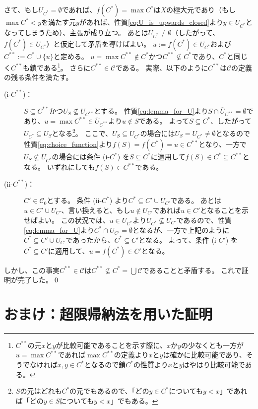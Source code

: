 ﻿\documentclass{ltjsarticle}
\theoremstyle{definition}
\begin{document}
さて、もし$U_{C^*} = \emptyset$であれば、$f(C^*) = \max C^*$は$X$の極大元であり（もし$\max C^* < y$を満たす元$y$があれば、性質\eqref{eq:U_is_upwards_closed}より$y \in U_{C^*}$となってしまうため）、主張が成り立つ。
あとは$U_{C^*} \neq \emptyset$（したがって、$f(C^*) \in U_{C^*}$）と仮定して矛盾を導けばよい。
$u := f(C^*) \in U_{C^*}$および$C^{**} := C^* \cup \{u\}$と定める。
$u = \max C^{**} \not\in C^*$かつ$C^{**} \not\subseteq C^*$であり、$C^*$と同じく$C^{**}$も鎖である\footnote{$C^{**}$の元$x$と$y$が比較可能であることを示す際に、$x$か$y$の少なくとも一方が$u = \max C^{**}$であれば$\max C^{**}$の定義より$x$と$y$は確かに比較可能であり、そうでなければ$x,y \in C^*$となるので鎖$C^*$の性質より$x$と$y$はやはり比較可能である。}。
さらに$C^{**} \in \mathcal{C}$である。
実際、以下のように$C^{**}$は$\mathcal{C}$の定義の残る条件を満たす。
\begin{description}
  \item[(i-$C^{**}$)：]
  $S \subseteq C^{**}$かつ$U_S \not\subseteq U_{C^{**}}$とする。
  性質\eqref{eq:lemma_for_U}より$S \cap \overline{U}_{C^{**}} = \emptyset$であり、$u = \max C^{**} \in \overline{U}_{C^{**}}$より$u \not\in S$である。
  よって$S \subseteq C^*$、したがって$U_{C^*} \subseteq U_S$となる\footnote{$S$の元はどれも$C^*$の元でもあるので、「どの$y \in C^*$についても$y < x$」であれば「どの$y \in S$についても$y < x$」でもある。}。
  ここで、$U_S \subseteq U_{C^*}$の場合には$U_S = U_{C^*} \neq \emptyset$となるので性質\eqref{eq:choice_function}より$f(S) = f(C^*) = u \in C^{**}$となり、一方で$U_S \not\subseteq U_{C^*}$の場合には条件 (i-$C^*$) を$S \subseteq C^*$に適用して$f(S) \in C^* \subseteq C^{**}$となる。
  いずれにしても$f(S) \in C^{**}$である。
  \item[(ii-$C^{**}$)：]
  $C' \in \mathcal{C}_0$とする。
  条件 (ii-$C^*$) より$C^* \subseteq C' \cup U_{C'}$である。
  あとは$u \in C' \cup U_{C'}$、言い換えると、もし$u \not\in U_{C'}$であれば$u \in C'$となることを示せばよい。
  この状況では、$u \in U_{C^*}$より$U_{C^*} \not\subseteq U_{C'}$であるので、性質\eqref{eq:lemma_for_U}より$C^* \cap U_{C'} = \emptyset$となるが、一方で上記のように$C^* \subseteq C' \cup U_{C'}$であったから、$C^* \subseteq C'$となる。
  よって、条件 (i-$C'$) を$C^* \subseteq C'$に適用して、$u = f(C^*) \in C'$となる。
\end{description}
しかし、この事実$C^{**} \in \mathcal{C}$は$C^{**} \not\subseteq C^* = \bigcup \mathcal{C}$であることと矛盾する。
これで証明が完了した。\qed


\section*{おまけ：超限帰納法を用いた証明}
\end{document}
